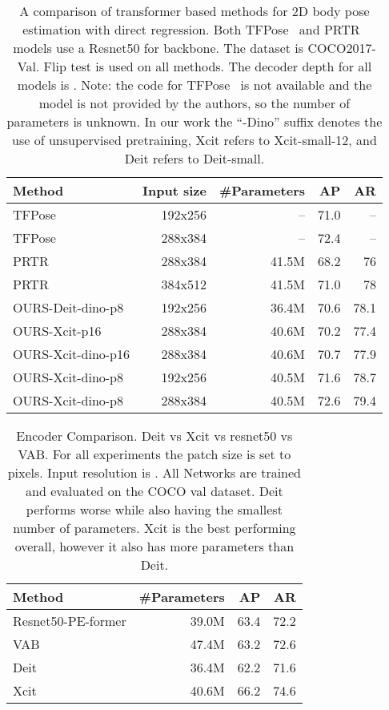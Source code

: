 \documentclass[runningheads]{llncs}
\begin{document}
\begin{table}[t]
  \centering
  \begin{tabular}{|l||r|r|r|r|}
   \hline 
   {\bf Method} & {\bf Input size} & {\bf \#Parameters} & {\bf AP} & {\bf AR} \\
   \hline\hline
   TFPose       & 192x256 & --    & 71.0 & -- \\
   \hline
   TFPose       & 288x384 & --    & 72.4 & -- \\
   \hline
   PRTR         & 288x384 & 41.5M & 68.2 & 76 \\ 
   \hline
   PRTR         & 384x512 & 41.5M & 71.0 & 78 \\ 
   \hline
   OURS-Deit-dino-p8  & 192x256 & 36.4M & 70.6 & 78.1 \\
   \hline
   OURS-Xcit-p16      & 288x384 & 40.6M & 70.2 & 77.4 \\
   \hline
OURS-Xcit-dino-p16 & 288x384 & 40.6M & 70.7 & 77.9 \\ 
   \hline
OURS-Xcit-dino-p8  & 192x256 & 40.5M & 71.6 & 78.7 \\ 
   \hline
OURS-Xcit-dino-p8  & 288x384 & 40.5M & 72.6 & 79.4 \\ 
   
   \hline
  \end{tabular}
  \caption{A comparison of transformer based methods for 2D body pose estimation with direct regression. Both TFPose~\cite{mao2021tfpose} and PRTR~\cite{li2021pose} models use a Resnet50 for backbone. The dataset is COCO2017-Val. Flip test is used on all methods. The decoder depth for all models is . Note: the code for TFPose~\cite{mao2021tfpose} is not available and the model is not provided by the authors, so the number of parameters is unknown. In our work the ``-Dino'' suffix denotes the use of unsupervised pretraining, Xcit refers to Xcit-small-12, and Deit refers to Deit-small.}
  \label{tab:cmp}
\end{table}


\begin{table}[t]
  \centering
  \begin{tabular}{|l||r|r|r|}
   \hline 
   {\bf Method} &  {\bf \#Parameters}  & {\bf AP} & {\bf AR} \\
   \hline\hline
   Resnet50-PE-former   & 39.0M & 63.4 & 72.2 \\ 
   \hline
   VAB             & 47.4M & 63.2 & 72.6 \\ 
   \hline
   Deit             & 36.4M & 62.2 & 71.6 \\ 
   \hline
   Xcit            & 40.6M & 66.2 & 74.6 \\ 
   \hline
  \end{tabular}
  \caption{Encoder Comparison. Deit vs Xcit vs resnet50 vs VAB. 
  For all experiments the patch size is set to  pixels. Input resolution is .
  All Networks are trained and evaluated on the COCO val dataset. Deit performs worse while also having the smallest number of parameters. Xcit is the best performing overall, however it also has  more parameters than Deit.}
  \label{tab:enc_cmp}
\end{table}
\end{document}
